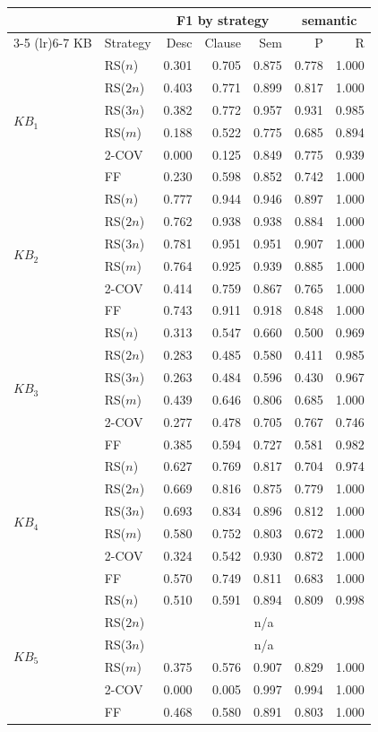 \begin{tabular}{llrrrrr}
\toprule
 &  & \multicolumn{3}{c}{F1 by strategy} & \multicolumn{2}{c}{semantic} \\
\cmidrule(lr){3-5} \cmidrule(lr){6-7}
KB & Strategy & Desc & Clause & Sem & P & R \\
\midrule
\multirow{6}{*}{$KB_1$} & RS($n$) & 0.301 & 0.705 & 0.875 & 0.778 & 1.000 \\
 & RS($2n$) & 0.403 & 0.771 & 0.899 & 0.817 & 1.000 \\
 & RS($3n$) & 0.382 & 0.772 & 0.957 & 0.931 & 0.985 \\
 & RS($m$) & 0.188 & 0.522 & 0.775 & 0.685 & 0.894 \\
 & 2-COV & 0.000 & 0.125 & 0.849 & 0.775 & 0.939 \\
 & FF & 0.230 & 0.598 & 0.852 & 0.742 & 1.000 \\
\midrule
\multirow{6}{*}{$KB_2$} & RS($n$) & 0.777 & 0.944 & 0.946 & 0.897 & 1.000 \\
 & RS($2n$) & 0.762 & 0.938 & 0.938 & 0.884 & 1.000 \\
 & RS($3n$) & 0.781 & 0.951 & 0.951 & 0.907 & 1.000 \\
 & RS($m$) & 0.764 & 0.925 & 0.939 & 0.885 & 1.000 \\
 & 2-COV & 0.414 & 0.759 & 0.867 & 0.765 & 1.000 \\
 & FF & 0.743 & 0.911 & 0.918 & 0.848 & 1.000 \\
\midrule
\multirow{6}{*}{$KB_3$} & RS($n$) & 0.313 & 0.547 & 0.660 & 0.500 & 0.969 \\
 & RS($2n$) & 0.283 & 0.485 & 0.580 & 0.411 & 0.985 \\
 & RS($3n$) & 0.263 & 0.484 & 0.596 & 0.430 & 0.967 \\
 & RS($m$) & 0.439 & 0.646 & 0.806 & 0.685 & 1.000 \\
 & 2-COV & 0.277 & 0.478 & 0.705 & 0.767 & 0.746 \\
 & FF & 0.385 & 0.594 & 0.727 & 0.581 & 0.982 \\
\midrule
\multirow{6}{*}{$KB_4$} & RS($n$) & 0.627 & 0.769 & 0.817 & 0.704 & 0.974 \\
 & RS($2n$) & 0.669 & 0.816 & 0.875 & 0.779 & 1.000 \\
 & RS($3n$) & 0.693 & 0.834 & 0.896 & 0.812 & 1.000 \\
 & RS($m$) & 0.580 & 0.752 & 0.803 & 0.672 & 1.000 \\
 & 2-COV & 0.324 & 0.542 & 0.930 & 0.872 & 1.000 \\
 & FF & 0.570 & 0.749 & 0.811 & 0.683 & 1.000 \\
\midrule
\multirow{6}{*}{$KB_5$} & RS($n$) & 0.510 & 0.591 & 0.894 & 0.809 & 0.998 \\
 & RS($2n$) & \multicolumn{5}{c}{n/a} \\
 & RS($3n$) & \multicolumn{5}{c}{n/a} \\
 & RS($m$) & 0.375 & 0.576 & 0.907 & 0.829 & 1.000 \\
 & 2-COV & 0.000 & 0.005 & 0.997 & 0.994 & 1.000 \\
 & FF & 0.468 & 0.580 & 0.891 & 0.803 & 1.000 \\
\bottomrule
\end{tabular}
